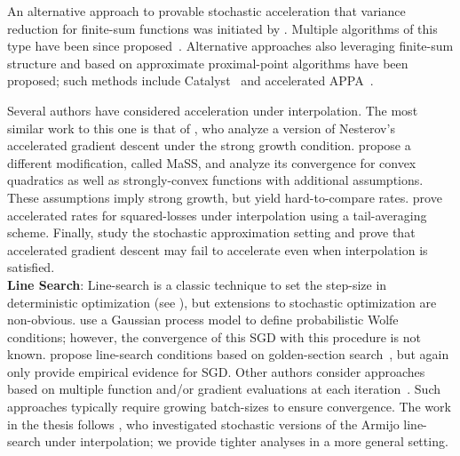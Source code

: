 An alternative approach to provable stochastic acceleration that variance reduction for finite-sum functions was initiated by \citet{allen-zhu2017katyusha}.
Multiple algorithms of this type have been since proposed~\citep{allen-zhou2018katyushax, tang2018restkatyusha, kovalev2020loopless}.
Alternative approaches also leveraging finite-sum structure and based on approximate proximal-point algorithms have been proposed; such methods include Catalyst~\citep{lin2017catalyst} and accelerated APPA~\citep{frostig2015unregularizing}.

Several authors have considered acceleration under interpolation.
The most similar work to this one is that of \citet{vaswani2019fast}, who analyze a version of Nesterov's accelerated gradient descent under the strong growth condition. 
\citet{liu2020accelerating} propose a different modification, called MaSS, and analyze its convergence for convex quadratics as well as strongly-convex functions with additional assumptions. 
These assumptions imply strong growth, but yield hard-to-compare rates. 
\citet{jain2018accelerating} prove accelerated rates for squared-losses under interpolation using a tail-averaging scheme. 
Finally, \citet{assran2020convergence} study the stochastic approximation setting and prove that accelerated gradient descent may fail to accelerate even when interpolation is satisfied.\\

\noindent \textbf{Line Search}:
Line-search is a classic technique to set the step-size in deterministic optimization (see \citet{nocedal1999numerical}), but extensions to stochastic optimization are non-obvious. 
\citet{mahsereci2017pls} use a Gaussian process model to define probabilistic Wolfe conditions; however, the convergence of this \ac{SGD} with this procedure is not known.
\citet{fridovich2019choosing} propose line-search conditions based on golden-section search~\citep{avriel1968golden}, but again only provide empirical evidence for \ac{SGD}. 
Other authors consider approaches based on multiple function and/or gradient evaluations at each iteration~\citep{friedlander2012hybrid, byrd2012sample, de2016big, krejic2013line, paquette2020stochastic}.
Such approaches typically require growing batch-sizes to ensure convergence.
The work in the thesis follows \citet{vaswani2019painless}, who investigated stochastic versions of the Armijo line-search under interpolation; we provide tighter analyses in a more general setting.\\ 


